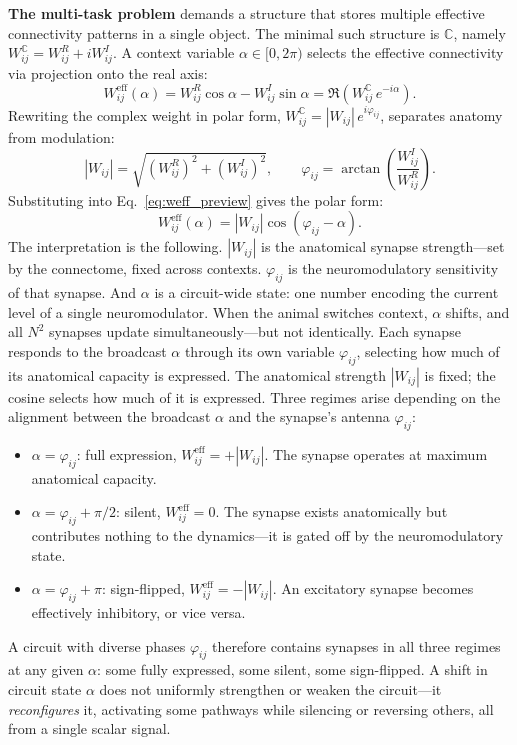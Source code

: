\documentclass[11pt]{article}
\begin{document}
\textbf{The multi-task problem} demands a structure that stores multiple effective connectivity patterns in a single object. The minimal such structure is $\mathbb{C}$, namely $W_{ij}^{\mathbb{C}} = W_{ij}^R + iW_{ij}^I$. A context variable $\alpha \in [0, 2\pi)$ selects the effective connectivity via projection onto the real axis:
\begin{equation}
W_{ij}^{\text{eff}}(\alpha) = W_{ij}^R\cos\alpha 
- W_{ij}^I\sin\alpha = \Re\!\left(W_{ij}^{\mathbb{C}}\, 
e^{-i\alpha}\right).
\label{eq:weff_preview}
\end{equation}
Rewriting the complex weight in polar form, 
$W_{ij}^{\mathbb{C}} = |W_{ij}|\,e^{i\varphi_{ij}}$, separates anatomy 
from modulation:
\begin{equation}
|W_{ij}| = \sqrt{(W_{ij}^R)^2 + (W_{ij}^I)^2}, \qquad 
\varphi_{ij} = \arctan\!\left(\frac{W_{ij}^I}{W_{ij}^R}\right).
\end{equation}
Substituting into Eq.~\eqref{eq:weff_preview} gives the polar form:
\begin{equation}
W_{ij}^{\text{eff}}(\alpha) = |W_{ij}|\cos(\varphi_{ij} - \alpha).
\label{eq:weff_polar}
\end{equation}
The interpretation is the following. $|W_{ij}|$ is the anatomical synapse strength---set by the connectome, fixed across contexts. $\varphi_{ij}$ is the neuromodulatory sensitivity of that synapse.
And $\alpha$ is a circuit-wide state: one number encoding the current 
level of a single neuromodulator. When the animal switches context, 
$\alpha$ shifts, and all $N^2$ synapses update simultaneously---but 
not identically. Each synapse responds to the broadcast $\alpha$ 
through its own variable $\varphi_{ij}$, selecting how much of its 
anatomical capacity is expressed.
The anatomical strength $|W_{ij}|$ is fixed; the cosine selects how 
much of it is expressed. Three regimes arise depending on the 
alignment between the broadcast $\alpha$ and the synapse's antenna 
$\varphi_{ij}$:
\begin{itemize}
\item $\alpha = \varphi_{ij}$: full expression, 
$W_{ij}^{\text{eff}} = +|W_{ij}|$. The synapse operates at maximum 
anatomical capacity.
\item $\alpha = \varphi_{ij} + \pi/2$: silent, 
$W_{ij}^{\text{eff}} = 0$. The synapse exists anatomically but 
contributes nothing to the dynamics---it is gated off by the 
neuromodulatory state.
\item $\alpha = \varphi_{ij} + \pi$: sign-flipped, 
$W_{ij}^{\text{eff}} = -|W_{ij}|$. An excitatory synapse becomes 
effectively inhibitory, or vice versa.
\end{itemize}
A circuit with diverse phases $\varphi_{ij}$ therefore contains 
synapses in all three regimes at any given $\alpha$: some fully 
expressed, some silent, some sign-flipped. A shift in circuit state $\alpha$ does 
not uniformly strengthen or weaken the circuit---it 
\emph{reconfigures} it, activating some pathways while silencing or reversing others, all from a single scalar signal.
\end{document}
